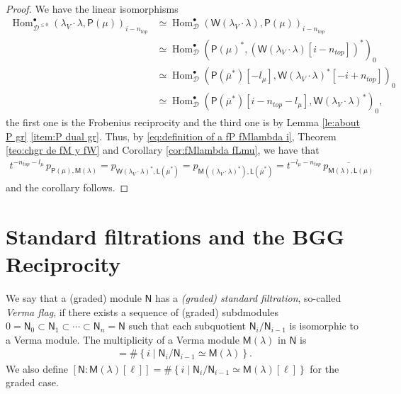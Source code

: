 \documentclass[reqno]{amsart}
\newcommand{\cO}{\mathcal{O}}
\renewcommand{\_}[1]{_{\left( #1 \right)}}
\renewcommand{\^}[1]{^{\left( #1 \right)}}
\newcommand\fL{\mathsf{L}}
\newcommand\fM{\mathsf{M}}
\newcommand\fN{\mathsf{N}}
\newcommand\fP{\mathsf{P}}
\newcommand\fW{\mathsf{W}}
\newcommand{\D}{\mathcal{D}}
\newcommand\Hom{\operatorname{Hom}}
\theoremstyle{plain}
\theoremstyle{definition}
\theoremstyle{remark}
\begin{document}
\begin{proof}
We have the linear isomorphisms
\begin{align*}
\Hom^\bullet_{\D^{\leq0}}(\lambda_V\cdot\lambda,\fP(\mu))_{i-n_{top}}&\simeq\Hom^\bullet_{\D}(\fW(\lambda_V\cdot\lambda),\fP(\mu))_{i-n_{top}}\\
&\simeq\Hom^\bullet_{\D}(\fP(\mu)^*,\left(\fW(\lambda_V\cdot\lambda)[i-n_{top}]\right)^*)_0\\
&\simeq\Hom^\bullet_{\D}(\fP(\overline{\mu}^*)[-l_\mu],\fW(\lambda_V\cdot\lambda)^*[-i+n_{top}])_0\\
&\simeq\Hom^\bullet_{\D}(\fP(\overline{\mu}^*)[i-n_{top}-l_\mu],\fW(\lambda_V\cdot\lambda)^*)_{0},
\end{align*}
the first one is the Frobenius reciprocity and the third one is by Lemma \ref{le:about P gr} \ref{item:P dual gr}. Thus, by \eqref{eq:definition of a fP fMlambda i}, Theorem \ref{teo:chgr de fM y fW} and Corollary \ref{cor:fMlambda fLmu}, we have that 
\begin{align*}
t^{-n_{top}-l_\mu}\,p_{\fP(\mu),\fM(\lambda)}
=p_{\fW(\lambda_V\cdot\lambda)^*,\fL(\overline{\mu}^*)}
=p_{\fM((\lambda_V\cdot\lambda)^*),\fL(\overline{\mu}^*)}
=t^{-l_\mu-n_{top}}\,\overline{p_{\fM(\lambda),\fL(\mu)}}
\end{align*}
and the corollary follows.
\end{proof}



\section{Standard filtrations and the BGG Reciprocity}\label{sec:standard filtration}


We say that a (graded) module $\fN$ has a {\it (graded) standard filtration}, so-called {\it Verma flag}, if there exists a sequence of (graded) subdmodules $0=\fN_0\subset\fN_1\subset\cdots\subset\fN_n=\fN$ such that each subquotient $\fN_i/\fN_{i-1}$ is isomorphic to a Verma module. The multiplicity of a Verma module $\fM(\lambda)$ in $\fN$ is
\begin{align*}
[\fN:\fM(\lambda)]=\#\left\{i\mid\fN_i/\fN_{i-1}\simeq\fM(\lambda)\right\}.
\end{align*}
We also define $\left[\fN:\fM(\lambda)[\ell]\right]=\#\left\{i\mid\fN_i/\fN_{i-1}\simeq\fM(\lambda)[\ell]\right\}$ for the graded case.
\end{document}
